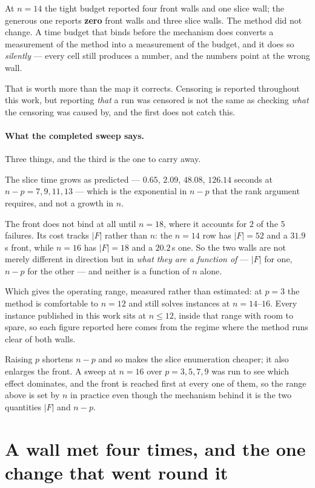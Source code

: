 \documentclass[11pt,a4paper]{article}
\begin{document}
\noindent
At $n=14$ the tight budget reported four front walls and one slice wall; the
generous one reports \textbf{zero} front walls and three slice walls.  The
method did not change.  A time budget that binds before the mechanism does
converts a measurement of the method into a measurement of the budget, and it
does so \emph{silently} --- every cell still produces a number, and the numbers
point at the wrong wall.

That is worth more than the map it corrects.  Censoring is reported throughout
this work, but reporting \emph{that} a run was censored is not the same as
checking \emph{what} the censoring was caused by, and the first does not catch
this.

\paragraph{What the completed sweep says.}
Three things, and the third is the one to carry away.

The slice time grows as predicted --- $0.65$, $2.09$, $48.08$, $126.14$
seconds at $n-p = 7, 9, 11, 13$ --- which is the exponential in $n-p$ that the
rank argument requires, and not a growth in $n$.

The front does not bind at all until $n=18$, where it accounts for $2$ of the
$5$ failures.  Its cost tracks $|F|$ rather than $n$: the $n=14$ row has
$|F|=52$ and a $31.9$\,s front, while $n=16$ has $|F|=18$ and a $20.2$\,s one.
So the two walls are not merely different in direction but in \emph{what they
are a function of} --- $|F|$ for one, $n-p$ for the other --- and neither is a
function of $n$ alone.

Which gives the operating range, measured rather than estimated: at $p=3$ the
method is comfortable to $n=12$ and still solves instances at $n=14$--$16$.
Every instance published in this work sits at $n \leqslant 12$, inside that
range with room to spare, so each figure reported here comes from the regime
where the method runs clear of both walls.

Raising $p$ shortens $n-p$ and so makes the slice enumeration cheaper; it also
enlarges the front.  A sweep at $n=16$ over $p = 3,5,7,9$ was run to see which
effect dominates, and the front is reached first at every one of them, so the
range above is set by $n$ in practice even though the mechanism behind it is
the two quantities $|F|$ and $n-p$.

\section{A wall met four times, and the one change that went round it}
\label{sec:wall}
\end{document}
